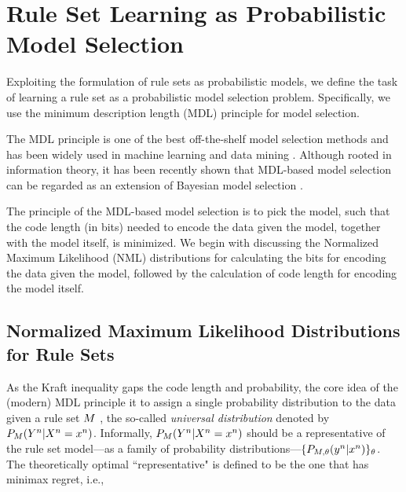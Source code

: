 \section{Rule Set Learning as Probabilistic Model Selection}
\label{sec:model_selection}

Exploiting the formulation of rule sets as probabilistic models, we define the task of learning a rule set as a probabilistic model selection problem. Specifically, we use the minimum description length (MDL) principle for model selection. 

The MDL principle is one of the best off-the-shelf model selection methods and has been widely used in machine learning and data mining \citep{grunwald2019minimum, galbrun2022minimum}. Although rooted in information theory, it has been recently shown that MDL-based model selection can be regarded as an extension of Bayesian model selection \citep{grunwald2019minimum}. 

The principle of the MDL-based model selection is to pick the model, such that the code length (in bits) needed to encode the data given the model, together with the model itself, is minimized. We begin with discussing the Normalized Maximum Likelihood (NML) distributions for calculating the bits for encoding the data given the model, followed by the calculation of code length for encoding the model itself. 

\subsection{Normalized Maximum Likelihood Distributions for Rule Sets}

As the Kraft inequality gaps the code length and probability, the core idea of the (modern) MDL principle it to assign a single probability distribution to the data given a rule set $M$ \citep{grunwald2019minimum}, the so-called \emph{universal distribution} denoted by $P_{M}(Y^n|X^n=x^n)$. Informally, $P_{M}(Y^n|X^n=x^n)$ should be a representative of the rule set model---as a family of probability distributions---$\{P_{M, \theta}(y^n | x^n)\}_\theta$.
The theoretically optimal ``representative" is defined to be the one that has minimax regret, i.e., 

